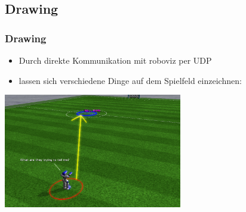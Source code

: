 
\subsection{Drawing}
 
\frame
{
  \frametitle{Drawing}
  \begin{itemize}
    \item Durch direkte Kommunikation mit roboviz per UDP
    \item lassen sich verschiedene Dinge auf dem Spielfeld einzeichnen:
  \end{itemize}
  
  \begin{center}\includegraphics[height=5cm, center]{drawing.png}\end{center}
}
